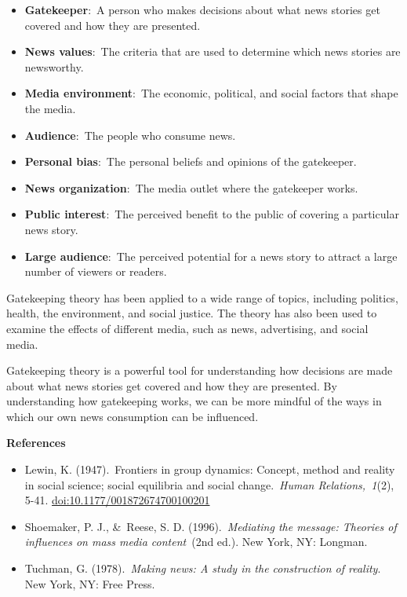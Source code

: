 \documentclass[
]{book}
\begin{document}
\begin{itemize}
\item
  \textbf{Gatekeeper}:~A person who makes decisions about what news stories get covered and how they are presented.
\item
  \textbf{News values}:~The criteria that are used to determine which news stories are newsworthy.
\item
  \textbf{Media environment}:~The economic, political, and social factors that shape the media.
\item
  \textbf{Audience}:~The people who consume news.
\item
  \textbf{Personal bias}:~The personal beliefs and opinions of the gatekeeper.
\item
  \textbf{News organization}:~The media outlet where the gatekeeper works.
\item
  \textbf{Public interest}:~The perceived benefit to the public of covering a particular news story.
\item
  \textbf{Large audience}:~The perceived potential for a news story to attract a large number of viewers or readers.
\end{itemize}

Gatekeeping theory has been applied to a wide range of topics, including politics, health, the environment, and social justice. The theory has also been used to examine the effects of different media, such as news, advertising, and social media.

Gatekeeping theory is a powerful tool for understanding how decisions are made about what news stories get covered and how they are presented. By understanding how gatekeeping works, we can be more mindful of the ways in which our own news consumption can be influenced.

\textbf{References}

\begin{itemize}
\item
  Lewin, K. (1947).~Frontiers in group dynamics: Concept, method and reality in social science; social equilibria and social change.~\emph{Human Relations,~1}(2), 5-41. \url{doi:10.1177/001872674700100201}
\item
  Shoemaker, P. J., \&~Reese, S. D. (1996).~\emph{Mediating the message: Theories of influences on mass media content}~(2nd ed.). New York, NY: Longman.
\item
  Tuchman, G. (1978).~\emph{Making news: A study in the construction of reality}. New York, NY: Free Press.
\end{itemize}
\end{document}
